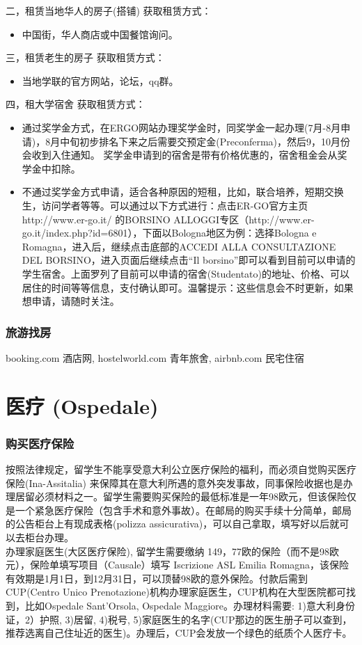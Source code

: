 \documentclass[3pt,a5paper,openright,twoside]{book}
\begin{document}
二，租赁当地华人的房子(搭铺)
获取租赁方式：
\begin{itemize}
\item 中国街，华人商店或中国餐馆询问。
\end{itemize} 

三，租赁老生的房子
获取租赁方式：
\begin{itemize}
\item 当地学联的官方网站，论坛，qq群。
\end{itemize} 

四，租大学宿舍
获取租赁方式：
	\begin{itemize}
		\item 通过奖学金方式，在ERGO网站办理奖学金时，同奖学金一起办理(7月-8月申请)，8月中旬初步排名下来之后需要交预定金(Preconferma)，然后9，10月份会收到入住通知。 奖学金申请到的宿舍是带有价格优惠的，宿舍租金会从奖学金中扣除。
		\item 不通过奖学金方式申请，适合各种原因的短租，比如，联合培养，短期交换生，访问学者等等。可以通过以下方式进行：点击ER-GO官方主页 http://www.er-go.it/ 的BORSINO ALLOGGI专区（http://www.er-go.it/index.php?id=6801），下面以Bologna地区为例：选择Bologna e Romagna，进入后，继续点击底部的ACCEDI ALLA CONSULTAZIONE DEL BORSINO，进入页面后继续点击“Il borsino”即可以看到目前可以申请的学生宿舍。上面罗列了目前可以申请的宿舍(Studentato)的地址、价格、可以居住的时间等等信息，支付确认即可。温馨提示：这些信息会不时更新，如果想申请，请随时关注。
	\end{itemize} 

\subsubsection{旅游找房}
booking.com 酒店网, hostelworld.com 青年旅舍, airbnb.com 民宅住宿



\section{医疗 (Ospedale)}


\subsubsection{购买医疗保险}

按照法律规定，留学生不能享受意大利公立医疗保险的福利，而必须自觉购买医疗保险(Ina-Assitalia) 来保障其在意大利所遇的意外突发事故，同事保险收据也是办理居留必须材料之一。留学生需要购买保险的最低标准是一年98欧元，但该保险仅是一个紧急医疗保险（包含手术和意外事故）。在邮局的购买手续十分简单，邮局的公告柜台上有现成表格(polizza assicurativa)，可以自己拿取，填写好以后就可以去柜台办理。\\
办理家庭医生(大区医疗保险), 留学生需要缴纳 149，77欧的保险（而不是98欧元），保险单填写项目（Causale）填写 Iscrizione ASL Emilia Romagna，该保险有效期是1月1日，到12月31日，可以顶替98欧的意外保险。付款后需到CUP(Centro Unico Prenotazione)机构办理家庭医生，CUP机构在大型医院都可找到，比如Ospedale Sant'Orsola, Ospedale Maggiore。办理材料需要: 1)意大利身份证，2）护照, 3)居留, 4)税号, 5)家庭医生的名字(CUP那边的医生册子可以查到，推荐选离自己住址近的医生)。办理后，CUP会发放一个绿色的纸质个人医疗卡。
\end{document}
